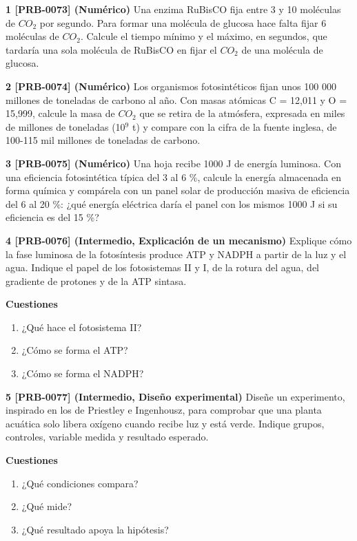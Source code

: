 \documentclass{book}
\begin{document}
\begin{tcolorbox}[title={Ejercicios}, studiumworked, breakable]

\noindent\textbf{1 [PRB-0073] (Numérico)}
Una enzima RuBisCO fija entre 3 y 10 moléculas de \(CO_{2}\) por segundo. Para formar una molécula de glucosa hace falta fijar 6 moléculas de \(CO_{2}\). Calcule el tiempo mínimo y el máximo, en segundos, que tardaría una sola molécula de RuBisCO en fijar el \(CO_{2}\) de una molécula de glucosa.


\noindent\textbf{2 [PRB-0074] (Numérico)}
Los organismos fotosintéticos fijan unos 100 000 millones de toneladas de carbono al año. Con masas atómicas C = 12,011 y O = 15,999, calcule la masa de \(CO_{2}\) que se retira de la atmósfera, expresada en miles de millones de toneladas (10\({}^{9}\) t) y compare con la cifra de la fuente inglesa, de 100-115 mil millones de toneladas de carbono.


\noindent\textbf{3 [PRB-0075] (Numérico)}
Una hoja recibe 1000 J de energía luminosa. Con una eficiencia fotosintética típica del 3 al 6 \%, calcule la energía almacenada en forma química y compárela con un panel solar de producción masiva de eficiencia del 6 al 20 \%: ¿qué energía eléctrica daría el panel con los mismos 1000 J si su eficiencia es del 15 \%?


\noindent\textbf{4 [PRB-0076] (Intermedio, Explicación de un mecanismo)}
Explique cómo la fase luminosa de la fotosíntesis produce ATP y NADPH a partir de la luz y el agua. Indique el papel de los fotosistemas II y I, de la rotura del agua, del gradiente de protones y de la ATP sintasa.


\noindent\textbf{Cuestiones}
\begin{enumerate}
\item ¿Qué hace el fotosistema II?
\item ¿Cómo se forma el ATP?
\item ¿Cómo se forma el NADPH?
\end{enumerate}

\noindent\textbf{5 [PRB-0077] (Intermedio, Diseño experimental)}
Diseñe un experimento, inspirado en los de Priestley e Ingenhousz, para comprobar que una planta acuática solo libera oxígeno cuando recibe luz y está verde. Indique grupos, controles, variable medida y resultado esperado.


\noindent\textbf{Cuestiones}
\begin{enumerate}
\item ¿Qué condiciones compara?
\item ¿Qué mide?
\item ¿Qué resultado apoya la hipótesis?
\end{enumerate}


\end{tcolorbox}
\end{document}
